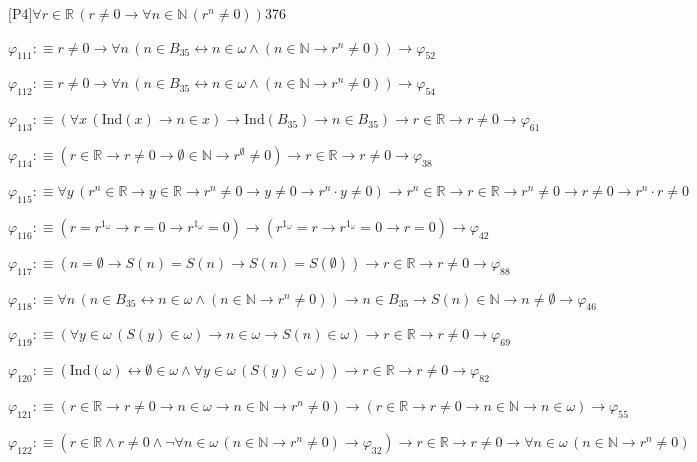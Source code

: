 \begin{fullproof}{[P4]}{$\forall r \in \mathbb{R}\,(r \neq 0 \to \forall n \in \mathbb{N}\,({{r}^{n}} \neq 0))$}{376}
\begin{abbrevlist}
\item $\varphi_{111} :\equiv r \neq 0 \to \forall n\,(n \in B_{35} \leftrightarrow n \in \omega \land (n \in \mathbb{N} \to {{r}^{n}} \neq 0)) \to \varphi_{52}$
\item $\varphi_{112} :\equiv r \neq 0 \to \forall n\,(n \in B_{35} \leftrightarrow n \in \omega \land (n \in \mathbb{N} \to {{r}^{n}} \neq 0)) \to \varphi_{54}$
\item $\varphi_{113} :\equiv (\forall x\,(\mathrm{Ind}(x) \to n \in x) \to \mathrm{Ind}(B_{35}) \to n \in B_{35}) \to r \in \mathbb{R} \to r \neq 0 \to \varphi_{61}$
\item $\varphi_{114} :\equiv (r \in \mathbb{R} \to r \neq 0 \to \emptyset \in \mathbb{N} \to {{r}^{\emptyset}} \neq 0) \to r \in \mathbb{R} \to r \neq 0 \to \varphi_{38}$
\item $\varphi_{115} :\equiv \forall y\,({{r}^{n}} \in \mathbb{R} \to y \in \mathbb{R} \to {{r}^{n}} \neq 0 \to y \neq 0 \to {{r}^{n}} \cdot y \neq 0) \to {{r}^{n}} \in \mathbb{R} \to r \in \mathbb{R} \to {{r}^{n}} \neq 0 \to r \neq 0 \to {{r}^{n}} \cdot r \neq 0$
\item $\varphi_{116} :\equiv (r = {{r}^{1_{\omega}}} \to r = 0 \to {{r}^{1_{\omega}}} = 0) \to ({{r}^{1_{\omega}}} = r \to {{r}^{1_{\omega}}} = 0 \to r = 0) \to \varphi_{42}$
\item $\varphi_{117} :\equiv (n = \emptyset \to S(n) = S(n) \to S(n) = S(\emptyset)) \to r \in \mathbb{R} \to r \neq 0 \to \varphi_{88}$
\item $\varphi_{118} :\equiv \forall n\,(n \in B_{35} \leftrightarrow n \in \omega \land (n \in \mathbb{N} \to {{r}^{n}} \neq 0)) \to n \in B_{35} \to S(n) \in \mathbb{N} \to n \neq \emptyset \to \varphi_{46}$
\item $\varphi_{119} :\equiv (\forall y \in \omega\,(S(y) \in \omega) \to n \in \omega \to S(n) \in \omega) \to r \in \mathbb{R} \to r \neq 0 \to \varphi_{69}$
\item $\varphi_{120} :\equiv (\mathrm{Ind}(\omega) \leftrightarrow \emptyset \in \omega \land \forall y \in \omega\,(S(y) \in \omega)) \to r \in \mathbb{R} \to r \neq 0 \to \varphi_{82}$
\item $\varphi_{121} :\equiv (r \in \mathbb{R} \to r \neq 0 \to n \in \omega \to n \in \mathbb{N} \to {{r}^{n}} \neq 0) \to (r \in \mathbb{R} \to r \neq 0 \to n \in \mathbb{N} \to n \in \omega) \to \varphi_{55}$
\item $\varphi_{122} :\equiv (r \in \mathbb{R} \land r \neq 0 \land \neg \forall n \in \omega\,(n \in \mathbb{N} \to {{r}^{n}} \neq 0) \to \varphi_{32}) \to r \in \mathbb{R} \to r \neq 0 \to \forall n \in \omega\,(n \in \mathbb{N} \to {{r}^{n}} \neq 0)$

\end{abbrevlist}
\end{fullproof}
